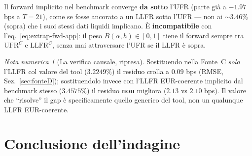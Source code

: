 \documentclass[11pt,a4paper]{article}
\theoremstyle{definition}
\theoremstyle{remark}
\newtheorem*{attenzione}{Nota numerica}
\newcommand{\UFR}{\mathrm{UFR}}
\newcommand{\LLFR}{\mathrm{LLFR}}
\begin{document}
Il forward implicito nel benchmark converge \textbf{da sotto} l'UFR (parte gi\`a a $-1.97$ bps
a $T=21$), come se fosse ancorato a un LLFR sotto l'UFR --- non ai $\sim3.46\%$ (sopra) che i
suoi stessi dati liquidi implicano. \`E \textbf{incompatibile} con l'eq.~\eqref{eq:extrap-fwd-app}:
il peso $B(\alpha,h)\in[0,1]$ tiene il forward sempre tra $\UFR^C$ e $\LLFR^C$, senza mai
attraversare l'UFR se il LLFR \`e sopra.

\begin{attenzione}[La verifica causale, ripresa]
Sostituendo nella Fonte~C \emph{solo} l'LLFR col valore del tool ($3.2249\%$) il residuo crolla
a $0.09$ bps (RMSE, Sez.~\ref{sec:fonteD}); sostituendolo invece con l'LLFR EUR-coerente
implicito dal benchmark stesso ($3.4575\%$) il residuo \textbf{non} migliora ($2.13$ vs $2.10$
bps). Il valore che ``risolve'' il gap \`e specificamente quello generico del tool, non un
qualunque LLFR EUR-coerente.
\end{attenzione}

\section{Conclusione dell'indagine}
\label{sec:conclusione}
\end{document}
